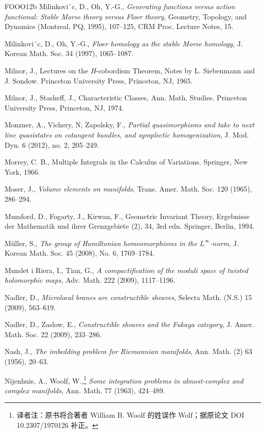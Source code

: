 \begin{thebibliography}{FOOO12b}
 Milinkovi´c, D., Oh, Y.-G., \emph{Generating functions versus action func\-tional:
  Stable Morse theory versus Floer theory}, Geometry, Topology, and Dynamics (Montreal, PQ, 1995),
  107–125, CRM Proc. Lecture Notes, 15.

 Milinkovi´c, D., Oh, Y.-G., \emph{Floer homology as the stable Morse homol\-ogy},
  J. Korean Math. Soc. 34 (1997), 1065–1087.

 Milnor, J., Lectures on the \emph{H}-cobordism Theorem, Notes by L. Sieben\-mann
  and J. Sondow. Princeton University Press, Princeton, NJ, 1965.

 Milnor, J., Stasheﬀ, J., Characteristic Classes, Ann. Math. Studies. Princeton
  University Press, Princeton, NJ, 1974.

 Monzner, A., Vichery, N, Zapolsky, F., \emph{Partial quasimorphisms and take to
  next line quasistates on cotangent bundles, and symplectic homogenization}, J. Mod. Dyn. 6 (2012), no.
  2, 205–249.

 Morrey, C. B., Multiple Integrals in the Calculus of Variations. Springer, New York,
  1966.

 Moser, J., \emph{Volume elements on manifolds}, Trans. Amer. Math. Soc. 120 (1965),
  286–294.

 Mumford, D., Fogarty, J., Kirwan, F., Geometric Invariant Theory, Ergebnisse der
  Mathematik und ihrer Grenzgebiete (2), 34, 3rd edn. Springer, Berlin, 1994.

 Müller, S., \emph{The group of Hamiltonian homeomorphisms in the $L^\infty$-norm},
  J. Korean Math. Soc. 45 (2008), No. 6, 1769–1784.

 Mundet i Riera, I., Tian, G., \emph{A compactification of the moduli space of
  twisted holomorphic maps,} Adv. Math. 222 (2009), 1117–1196.

 Nadler, D., \emph{Microlocal branes are constructible sheaves}, Selecta Math. (N.S.)
  15 (2009), 563–619.

 Nadler, D., Zaslow, E., \emph{Constructible sheaves and the Fukaya category}, J.
  Amer. Math. Soc. 22 (2009), 233–286.

 Nash, J., \emph{The imbedding problem for Riemannian manifolds}, Ann. Math. (2) 63
  (1956), 20–63.

 Nijenhuis, A., Woolf, W.,\footnote{译者注：原书将合著者 William B. Woolf 的姓误作 Wolf；据原论文 DOI 10.2307/1970126 补正。} \emph{Some integration problems in almost-complex and
  complex manifolds}, Ann. Math. 77 (1963), 424–489.


\end{thebibliography}
